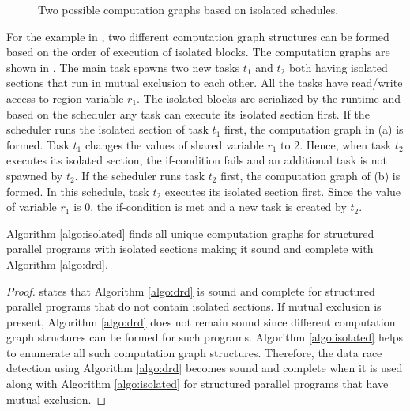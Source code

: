 \begin{figure}
  \caption{Two possible computation graphs based on isolated schedules.}
  \vspace{-1em}
   \label{fig:cg-isolated}
\end{figure}

For the example in , two different computation graph structures can be formed based on the order of execution of isolated blocks. The computation graphs are shown in . The main task spawns two new tasks $t_1$ and $t_2$ both having isolated sections that run in mutual exclusion to each other. All the tasks have read/write access to region variable $r_1$. The isolated blocks are serialized by the runtime and based on the scheduler any task can execute its isolated section first. If the scheduler runs the isolated section of task $t_1$ first, the computation graph in (a) is formed. Task $t_1$ changes the values of shared variable $r_1$ to 2. Hence, when task $t_2$ executes its isolated section, the if-condition fails and an additional task is not spawned by $t_2$. If the scheduler runs task $t_2$ first, the computation graph of (b) is formed. In this schedule, task $t_2$ executes its isolated section first. Since the value of variable $r_1$ is 0, the if-condition is met and a new task is created by $t_2$.

\begin{theorem}
Algorithm \ref{algo:isolated} finds all unique computation graphs for structured parallel programs with isolated sections making it sound and complete with Algorithm \ref{algo:drd}.
\end{theorem}

\begin{proof}
states that Algorithm \ref{algo:drd} is sound and complete for structured parallel programs that do not contain isolated sections. If mutual exclusion is present, Algorithm \ref{algo:drd} does not remain sound since different computation graph structures can be formed for such programs. Algorithm \ref{algo:isolated} helps to enumerate all such computation graph structures. Therefore, the data race detection using Algorithm \ref{algo:drd} becomes sound and complete when it is used along with Algorithm \ref{algo:isolated} for structured parallel programs that have mutual exclusion.
\end{proof}
